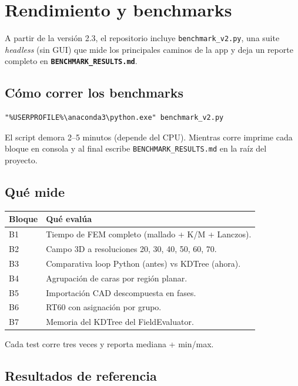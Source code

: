 \documentclass[11pt, a4paper]{article}
\begin{document}
\section{Rendimiento y benchmarks}

A partir de la versión 2.3, el repositorio incluye \texttt{benchmark\_v2.py},
una suite \emph{headless} (sin GUI) que mide los principales caminos
de la app y deja un reporte completo en \textbf{\texttt{BENCHMARK\_RESULTS.md}}.

\subsection{Cómo correr los benchmarks}

\begin{verbatim}
"%USERPROFILE%\anaconda3\python.exe" benchmark_v2.py
\end{verbatim}

El script demora 2--5 minutos (depende del CPU). Mientras corre
imprime cada bloque en consola y al final escribe
\texttt{BENCHMARK\_RESULTS.md} en la raíz del proyecto.

\subsection{Qué mide}

\begin{tabular}{ll}
  \toprule
  Bloque & Qué evalúa \\
  \midrule
  B1 & Tiempo de FEM completo (mallado + K/M + Lanczos). \\
  B2 & Campo 3D a resoluciones 20, 30, 40, 50, 60, 70. \\
  B3 & Comparativa loop Python (antes) vs KDTree (ahora). \\
  B4 & Agrupación de caras por región planar. \\
  B5 & Importación CAD descompuesta en fases. \\
  B6 & RT60 con asignación por grupo. \\
  B7 & Memoria del KDTree del FieldEvaluator. \\
  \bottomrule
\end{tabular}

Cada test corre tres veces y reporta mediana + min/max.

\subsection{Resultados de referencia}
\end{document}
